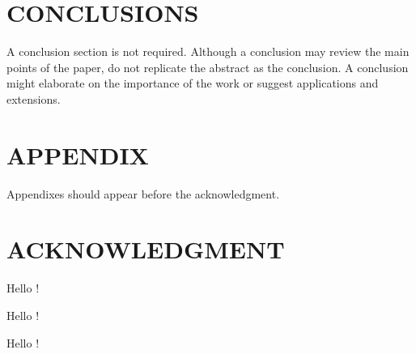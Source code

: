 \documentclass[conference]{IEEEtran}
\begin{document}
\section{CONCLUSIONS}

A conclusion section is not required. Although a conclusion may review the main points of the paper, do not replicate the abstract as the conclusion. A conclusion might elaborate on the importance of the work or suggest applications and extensions. 

\addtolength{\textheight}{-12cm}   %







\section*{APPENDIX}
Appendixes should appear before the acknowledgment.

\section*{ACKNOWLEDGMENT}
Hello !


\begin{thebibliography}{99}

 Hello !

 Hello !

\end{thebibliography}
\end{document}
